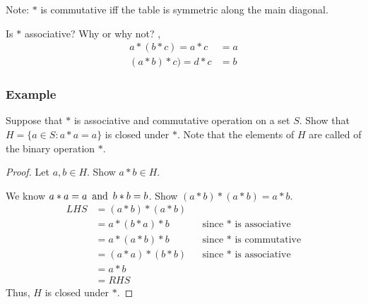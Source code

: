 Note: $*$ is commutative iff the table is symmetric along the main diagonal.

\noindent Is $*$ associative? Why or why not? ,
\begin{align*}
    a * (b*c) = a*c & = a \\
    (a*b)*c) = d*c & = b
\end{align*}

\subsubsection*{Example}
Suppose that $*$ is associative and commutative operation on a set $S$. Show that $H = \{a \in S : a * a = a\}$ is closed under $*$. Note that the elements of $H$ are called  of the binary operation $*$.
\begin{proof}
    Let $a,b \in H$. Show $a*b \in H$.

    \noindent We know $a*a=a \operatorname{~\text{and}~} b*b=b$. Show $(a*b)*(a*b)=a*b$.
    \begin{align*}
        LHS & = (a*b)*(a*b) \\
        & = a*(b*a)*b & & \text{since $*$ is associative} \\
        & = a*(a*b)*b & & \text{since $*$ is commutative} \\
        & = (a*a)*(b*b) & & \text{since $*$ is associative} \\
        & = a*b & \\
        & = RHS
    \end{align*}
    Thus, $H$ is closed under $*$.
\end{proof}